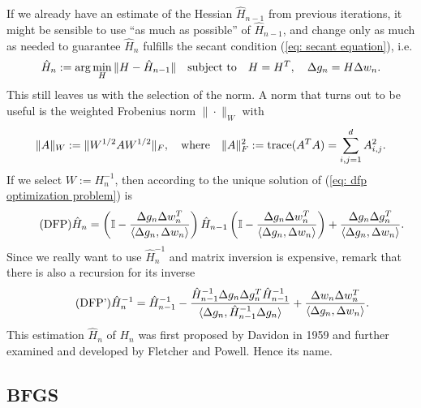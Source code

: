 If we already have an estimate of the Hessian \(\hat{H}_{n-1}\) from previous
iterations, it might be sensible to use ``as much as possible'' of
\(\hat{H}_{n-1}\), and change only as much as needed to guarantee \(\hat{H}_n\)
fulfills the secant condition (\ref{eq: secant equation}), i.e.
\begin{align}\label{eq: dfp optimization problem}
	\hat{H}_n &:=
	\arg\min_H \|H-\hat{H}_{n-1}\|
	& \text{subject to}\quad H=H^T,\quad  \Delta g_n= H\Delta w_n.
\end{align}
This still leaves us with the selection of the norm. A norm that turns out to 
be useful is the weighted Frobenius norm \(\|\cdot\|_W\) with
\begin{align*}
	\|A\|_W := \|W^{1/2}AW^{1/2}\|_F, \quad\text{where}\quad
	\|A\|_F^2 := \text{trace}(A^TA)=\sum_{i,j=1}^{d}A_{i,j}^2.
\end{align*}
If we select \(W:=H_n^{-1}\), then according to
\textcite{nocedalQuasiNewtonMethods2006} the unique solution of (\ref{eq: dfp
optimization problem}) is
\begin{align}
	\tag{DFP}
	\hat{H}_n =
	\left(\mathbb{I}-\frac{\Delta g_n \Delta w_n^T}{\langle \Delta g_n, \Delta w_n\rangle}\right)
	\hat{H}_{n-1}
	\left(\mathbb{I}-\frac{\Delta g_n \Delta w_n^T}{\langle \Delta g_n, \Delta w_n\rangle}\right)
	+ \frac{\Delta g_n \Delta g_n^T}{\langle \Delta g_n, \Delta w_n\rangle}.
\end{align}
Since we really want to use \(\hat{H}_n^{-1}\) and matrix inversion is expensive,
\textcite{nocedalQuasiNewtonMethods2006} remark that there is also a recursion
for its inverse
\begin{align*}
	\tag{DFP'}
	\hat{H}_n^{-1}
	= \hat{H}_{n-1}^{-1}
	- \frac{
		\hat{H}_{n-1}^{-1}\Delta g_n \Delta g_n^T \hat{H}_{n-1}^{-1}
	}{
		\langle \Delta g_n, \hat{H}_{n-1}^{-1}\Delta g_n\rangle
	}
	+ \frac{
		\Delta w_n \Delta w_n^T
	}{
		\langle \Delta g_n, \Delta w_n\rangle
	}.
\end{align*}
This estimation \(\hat{H}_n\) of \(H_n\) was first proposed by Davidon in 1959
and further examined and developed by Fletcher and Powell. Hence its name.

\subsection{BFGS}

